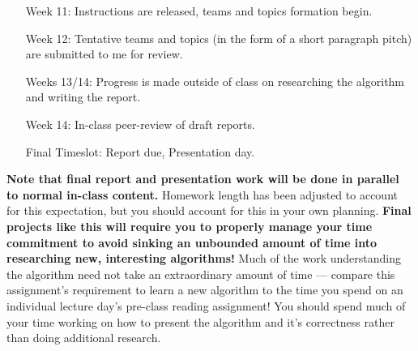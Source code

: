 \documentclass{article}
\begin{document}
\begin{itemize}
    \item[Week 11:] Instructions are released, teams and topics formation begin.
    \item[Week 12:] Tentative teams and topics (in the form of a short paragraph pitch) are submitted to me for review. 
    \item[Weeks 13/14:] Progress is made outside of class on researching the algorithm and writing the report. 
    \item[Week 14:] In-class peer-review of draft reports. 
    \item[Final Timeslot:] Report due, Presentation day.
\end{itemize}
\textbf{Note that final report and presentation work will be done in parallel to normal in-class content.} Homework length has been adjusted to account for this expectation, but you should account for this in your own planning. \textbf{Final projects like this will require you to properly manage your time commitment to avoid sinking an unbounded amount of time into researching new, interesting algorithms!} Much of the work understanding the algorithm need not take an extraordinary amount of time --- compare this assignment's requirement to learn a new algorithm to the time you spend on an individual lecture day's pre-class reading assignment! You should spend much of your time working on how to present the algorithm and it's correctness rather than doing additional research. 
\end{document}

